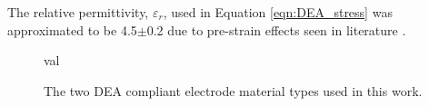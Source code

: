 The relative permittivity, $\varepsilon_r$, used in Equation \ref{eqn:DEA_stress} was approximated to be 4.5$\pm$0.2 due to pre-strain effects seen in literature\cite{Kofod2003, Choi2005, Wissler2007, Pan2015} .
\begin{figure}[H]
	\centering
 val	
	\hspace{1cm}
	\vspace{0.2cm}
	\caption{The two DEA compliant electrode material types used in this work.}
	\label{fig:DEAs}
\end{figure}

